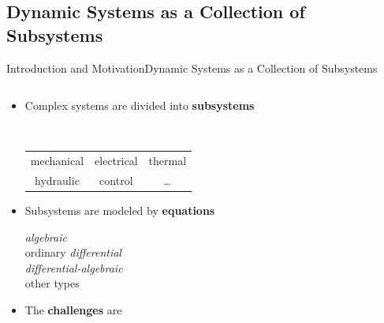 \subsection{Dynamic Systems as a Collection of Subsystems}

\begin{frame}{Introduction and Motivation}{Dynamic Systems as a Collection of Subsystems}
  \begin{columns}
    \begin{column}[c]{0.6\textwidth}
      \begin{itemize}
        \item<1-> Complex systems are divided into \textbf{subsystems} \\
        \begin{small}
          \quad\, \begin{tabular}{ccc}
            \raisebox{-1pt}{\scalebox{0.8}{\textcolor{fg_sl_color}{\faCogs}}} mechanical &
            \raisebox{-1pt}{\scalebox{0.8}{\textcolor{fg_sl_color}{\faBolt}}} electrical &
            \raisebox{-1pt}{\scalebox{0.8}{\textcolor{fg_sl_color}{\faFire}}} thermal \\
            \raisebox{-1pt}{\scalebox{0.8}{\textcolor{fg_sl_color}{\faOilCan}}} hydraulic &
            \raisebox{-1pt}{\scalebox{0.8}{\textcolor{fg_sl_color}{\faWaveSquare}}} control & \dots
          \end{tabular}
        \end{small}
        \item<2-> Subsystems are modeled by \textbf{equations} \\
        \begin{small}
          \qquad \emph{algebraic} \\
          \qquad ordinary \emph{differential} \\
          \qquad \emph{differential-algebraic} \\
          \qquad other types
        \end{small}
        \item<3-> The \textbf{challenges} are 
      \end{itemize}
    \end{column}
    \begin{column}[c]{0.4\textwidth}
      \centering
    \end{column}
  \end{columns}
\end{frame}

